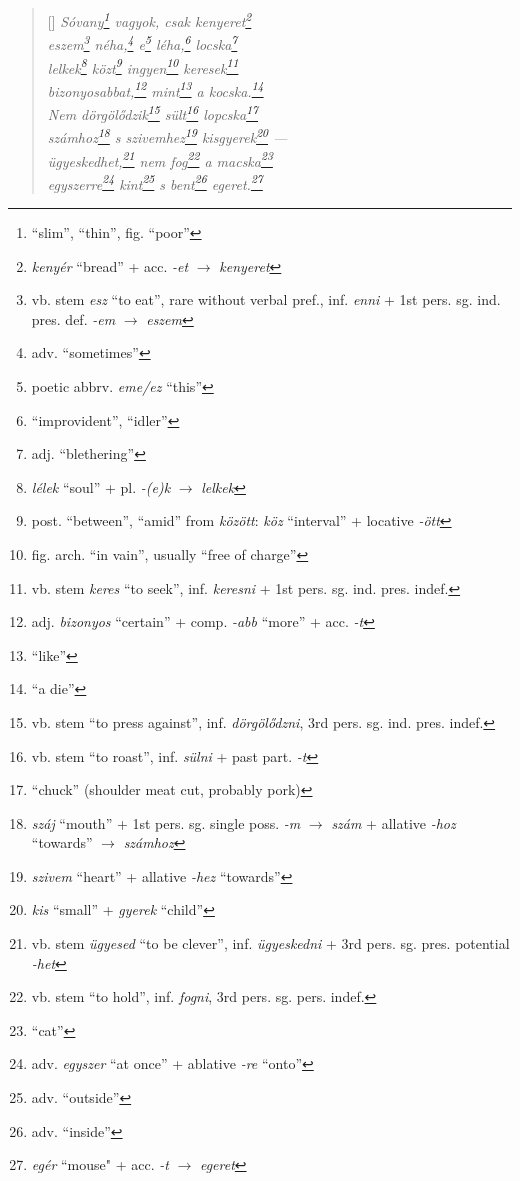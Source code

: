 \documentclass[a4paper,12pt,twoside,final]{book}
\begin{document}
\begin{verse}[\versewidth]
  \it
  Sóvany\footnote{``slim'', ``thin'', fig. ``poor''} vagyok, csak
  kenyeret\footnote{\emph{kenyér} ``bread'' + acc. \emph{-et}
  $\rightarrow$ \emph{kenyeret}} \\
  eszem\footnote{vb. stem \emph{esz} ``to eat'', rare without verbal
  pref., inf. \emph{enni} + 1st pers. sg. ind. pres. def. \emph{-em}
  $\rightarrow$ \emph{eszem}} néha,\footnote{adv. ``sometimes''} e\footnote{poetic
  abbrv. \emph{eme/ez} ``this''} léha,\footnote{``improvident'', ``idler''}
  locska\footnote{adj. ``blethering''} \\
  lelkek\footnote{\emph{lélek} ``soul'' +
  pl. \emph{-(e)k} $\rightarrow$ \emph{lelkek}} közt\footnote{post. ``between'',
  ``amid'' from \emph{között}: \emph{köz} ``interval'' +
   locative \emph{-ött}} ingyen\footnote{fig. arch. ``in vain'',
  usually ``free of charge''} keresek\footnote{vb. stem
  \emph{keres} ``to seek'', inf. \emph{keresni} + 1st
  pers. sg. ind. pres. indef.} \\
  bizonyosabbat,\footnote{adj. \emph{bizonyos} ``certain'' +
  comp. \emph{-abb} ``more'' + acc. \emph{-t}} mint\footnote{``like''} a
  kocska.\footnote{``a die''} \\
  Nem dörgölődzik\footnote{vb. stem ``to press against'',
  inf. \emph{dörgölődzni}, 3rd pers. sg. ind. pres. indef.}
  sült\footnote{vb. stem ``to roast'', inf. \emph{sülni} +
  past part. \emph{-t}} lopcska\footnote{``chuck'' (shoulder meat cut,
  probably pork)} \\
  számhoz\footnote{\emph{száj} ``mouth'' + 1st
  pers. sg. single poss. \emph{-m} $\rightarrow$ \emph{szám} +
  allative \emph{-hoz} ``towards'' $\rightarrow$ \emph{számhoz}} s
  szivemhez\footnote{\emph{szivem} ``heart'' +
  allative \emph{-hez} ``towards''} kisgyerek\footnote{\emph{kis} ``small'' +
  \emph{gyerek} ``child''} --- \\
  ügyeskedhet,\footnote{vb. stem \emph{ügyesed} ``to be clever'',
  inf. \emph{ügyeskedni} + 3rd pers. sg. pres. potential \emph{-het}}
  nem fog\footnote{vb. stem ``to hold'', inf. \emph{fogni}, 3rd
  pers. sg. pers. indef.} a macska\footnote{``cat''} \\
  egyszerre\footnote{adv. \emph{egyszer} ``at once'' +
  ablative \emph{-re} ``onto''} kint\footnote{adv. ``outside''} s
  bent\footnote{adv. ``inside''} egeret.\footnote{\emph{egér}
  ``mouse" + acc. \emph{-t} $\rightarrow$ \emph{egeret}}
\end{verse}
\end{document}

